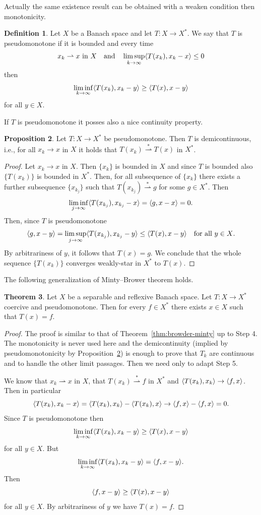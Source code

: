\documentclass[a4paper,10pt,twoside]{amsbook}
\numberwithin{section}{chapter}
\numberwithin{equation}{chapter}
\theoremstyle{definition}
\newtheorem{prop}{Proposition}[chapter]
\newtheorem{defi}[prop]{Definition}
\newtheorem{thm}[prop]{Theorem}
\DeclarePairedDelimiter{\dual}{\langle}{\rangle}
\begin{document}
Actually the same existence result can be obtained with a weaken condition then monotonicity.
\begin{defi}
Let $X$ be a Banach space and let $T\colon X\to X^*$. We say that $T$ is pseudomonotone if it is bounded and every time
\[
\text{$x_k\rightharpoonup x$ in $X$}\quad\text{and}\quad\limsup_{k\to\infty}\dual{T(x_k),x_k-x}\le0
\]
then
\[
\liminf_{k\to\infty}\dual{T(x_k),x_k-y}\ge\dual{T(x),x-y}
\]
for all $y\in X$.
\end{defi}
If $T$ is pseudomonotone it posses also a nice continuity property.
\begin{prop}
\label{prop:pseudomonotone-demicontinuous}
Let $T\colon X\to X^*$ be pseudomonotone. Then $T$ is demicontinuous, i.e., for all $x_k\to x$ in $X$ it holds that $T(x_k)\overset{*}{\rightharpoonup}T(x)$ in $X^*$.
\end{prop}
\begin{proof}
Let $x_k\to x$ in $X$. Then $\{x_k\}$ is bounded in $X$ and since $T$ is bounded also $\{T(x_k)\}$ is bounded in $X^*$. Then, for all subsequence of $\{x_k\}$ there exists a further subsequence $\{x_{k_j}\}$ such that $T(x_{k_j})\overset{*}{\rightharpoonup}g$ for some $g\in X^*$. Then
\[
\liminf_{j\to\infty}\dual{T(x_{k_j}),x_{k_j}-x}=\dual{g,x-x}=0.
\]
Then, since $T$ is pseudomonotone
\[
\dual{g,x-y}=\limsup_{j\to\infty}\dual{T(x_{k_j}),x_{k_j}-y}\le\dual{T(x),x-y}\quad\text{for all $y\in X$}.
\]
By arbitrariness of $y$, it follows that $T(x)=g$. We conclude that the whole sequence $\{T(x_k)\}$ converges weakly-star in $X^*$ to $T(x)$.
\end{proof}
The following generalization of Minty--Brower theorem holds.
\begin{thm}
\label{thm:browder-minty-generalized}
Let $X$ be a separable and reflexive Banach space. Let $T\colon X\to X^*$ coercive and pseudomonotone. Then for every $f\in X^*$ there exists $x\in X$ such that $T(x)=f$.
\end{thm}
\begin{proof}
The proof is similar to that of Theorem~\ref{thm:browder-minty} up to Step 4. The monotonicity is never used here and the demicontinuity (implied by pseudomonotonicity by Proposition~\ref{prop:pseudomonotone-demicontinuous}) is enough to prove that $T_k$ are continuous and to handle the other limit passages. Then we need only to adapt Step 5.

We know that $x_k\rightharpoonup x$ in $X$, that $T(x_k)\overset{*}{\rightharpoonup}f$ in $X^*$ and $\dual{T(x_k),x_k}\to\dual{f,x}$. Then in particular
\[
\dual{T(x_k),x_k-x}=\dual{T(x_k),x_k}-\dual{T(x_k),x}\to\dual{f,x}-\dual{f,x}=0.
\]
Since $T$ is pseudomonotone then
\[
\liminf_{k\to\infty}\dual{T(x_k),x_k-y}\ge\dual{T(x),x-y}
\]
for all $y\in X$. But
\[
\liminf_{k\to\infty}\dual{T(x_k),x_k-y}=\dual{f,x-y}.
\]
Then
\[
\dual{f,x-y}\ge\dual{T(x),x-y}
\]
for all $y\in X$. By arbitrariness of $y$ we have $T(x)=f$.
\end{proof}
\end{document}
